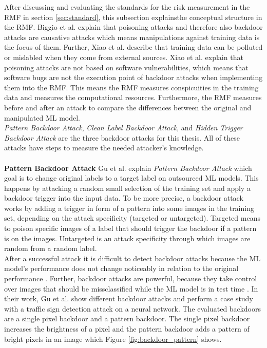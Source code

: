 After discussing and evaluating the standards for the risk measurement in the RMF in section \ref{sec:standard}, this subsection explainsthe conceptual structure in the RMF. Biggio et al. \cite{DBLP:conf/icml/BiggioNL12} explain that poisoning attacks and therefore also backdoor attacks are causative attacks which means manipulations against training data is the focus of them. Further, Xiao et al. \cite{DBLP:conf/sp/XiaoLZX18} describe that training data can be polluted or mislabled when they come from external sources. Xiao et al. explain that poisoning attacks are not based on software vulnerabilities, which means that software bugs are not the execution point of backdoor attacks when implementing them into the RMF. This means the RMF measures conspicuities in the training data and measures the computational resources. Furthermore, the RMF measures before and after an attack to compare the differences between the original and manipulated ML model. \\
\textit{Pattern Backdoor Attack}, \textit{Clean Label Backdoor Attack}, and \textit{Hidden Trigger Backdoor Attack} are the three backdoor attacks for this thesis. All of these attacks have steps to measure the needed attacker's knowledge. \\ \\
\textbf{Pattern Backdoor Attack} Gu et al. \cite{DBLP:journals/corr/abs-1708-06733} explain \textit{Pattern Backdoor Attack} which goal is to change original labels to a target label on outsourced ML models. This happens by attacking a random small selection of the training set and apply a backdoor trigger into the input data. To be more precise, a backdoor attack works by adding a trigger in form of a pattern into some images in the training set, depending on the attack specificity (targeted or untargeted). Targeted means to poison specific images of a label that should trigger the backdoor if a pattern is on the images. Untargeted is an attack specificity through which images are random from a random label. \\ After a successful attack it is difficult to detect backdoor attacks because the ML model's performance does not change noticeably in relation to the original performance \cite{DBLP:journals/corr/abs-2106-07925}. Further, backdoor attacks are powerful, because they take control over images that should be missclassified while the ML model is in test time \cite{turner2018clean}. In their work, Gu et al. show different backdoor attacks and perform a case study with a traffic sign detection attack on a neural network. The evaluated backdoors are a single pixel backdoor and a pattern backdoor. The single pixel backdoor increases the brightness of a pixel and the pattern backdoor adds a pattern of bright pixels in an image which Figure \ref{fig:backdoor_pattern} shows.

